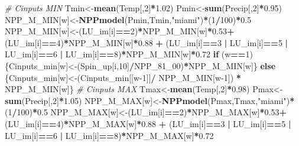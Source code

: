 \documentclass[
  10pt,
  b5paper,
]{book}
\newenvironment{Shaded}{\begin{snugshade}}{\end{snugshade}}
\newcommand{\CommentTok}[1]{\textcolor[rgb]{0.56,0.35,0.01}{\textit{#1}}}
\newcommand{\ControlFlowTok}[1]{\textcolor[rgb]{0.13,0.29,0.53}{\textbf{#1}}}
\newcommand{\DecValTok}[1]{\textcolor[rgb]{0.00,0.00,0.81}{#1}}
\newcommand{\FloatTok}[1]{\textcolor[rgb]{0.00,0.00,0.81}{#1}}
\newcommand{\KeywordTok}[1]{\textcolor[rgb]{0.13,0.29,0.53}{\textbf{#1}}}
\newcommand{\NormalTok}[1]{#1}
\newcommand{\OperatorTok}[1]{\textcolor[rgb]{0.81,0.36,0.00}{\textbf{#1}}}
\newcommand{\StringTok}[1]{\textcolor[rgb]{0.31,0.60,0.02}{#1}}
\begin{document}
\begin{Shaded}
\begin{Highlighting}[]
\CommentTok{# Cinputs MIN}
\NormalTok{Tmin<-}\KeywordTok{mean}\NormalTok{(Temp[,}\DecValTok{2}\NormalTok{]}\OperatorTok{*}\FloatTok{1.02}\NormalTok{)}
\NormalTok{Pmin<-}\KeywordTok{sum}\NormalTok{(Precip[,}\DecValTok{2}\NormalTok{]}\OperatorTok{*}\FloatTok{0.95}\NormalTok{)}
\NormalTok{NPP_M_MIN[w]<-}\KeywordTok{NPPmodel}\NormalTok{(Pmin,Tmin,}\StringTok{"miami"}\NormalTok{)}\OperatorTok{*}\NormalTok{(}\DecValTok{1}\OperatorTok{/}\DecValTok{100}\NormalTok{)}\OperatorTok{*}\FloatTok{0.5}
\NormalTok{NPP_M_MIN[w]<-(LU_im[i]}\OperatorTok{==}\DecValTok{2}\NormalTok{)}\OperatorTok{*}\NormalTok{NPP_M_MIN[w]}\OperatorTok{*}\FloatTok{0.53}\OperatorTok{+}\StringTok{ }\NormalTok{(LU_im[i]}\OperatorTok{==}\DecValTok{4}\NormalTok{)}\OperatorTok{*}\NormalTok{NPP_M_MIN[w]}\OperatorTok{*}\FloatTok{0.88} \OperatorTok{+}\StringTok{ }\NormalTok{(LU_im[i]}\OperatorTok{==}\DecValTok{3} \OperatorTok{|}\StringTok{ }\NormalTok{LU_im[i]}\OperatorTok{==}\DecValTok{5} \OperatorTok{|}\StringTok{ }\NormalTok{LU_im[i]}\OperatorTok{==}\DecValTok{6} \OperatorTok{|}\StringTok{ }\NormalTok{LU_im[i]}\OperatorTok{==}\DecValTok{8}\NormalTok{)}\OperatorTok{*}\NormalTok{NPP_M_MIN[w]}\OperatorTok{*}\FloatTok{0.72}
\ControlFlowTok{if}\NormalTok{ (w}\OperatorTok{==}\DecValTok{1}\NormalTok{) \{Cinputs_min[w]<-(Spin_up[i,}\DecValTok{10}\NormalTok{]}\OperatorTok{/}\NormalTok{NPP_}\DecValTok{81}\NormalTok{_}\DecValTok{00}\NormalTok{)}\OperatorTok{*}\NormalTok{NPP_M_MIN[w]\} }\ControlFlowTok{else}\NormalTok{ \{Cinputs_min[w]<-(Cinputs_min[[w}\DecValTok{-1}\NormalTok{]]}\OperatorTok{/}\StringTok{ }\NormalTok{NPP_M_MIN[w}\DecValTok{-1}\NormalTok{]) }\OperatorTok{*}\StringTok{ }\NormalTok{NPP_M_MIN[w]\} }
\CommentTok{# Cinputs MAX}
\NormalTok{Tmax<-}\KeywordTok{mean}\NormalTok{(Temp[,}\DecValTok{2}\NormalTok{]}\OperatorTok{*}\FloatTok{0.98}\NormalTok{)}
\NormalTok{Pmax<-}\KeywordTok{sum}\NormalTok{(Precip[,}\DecValTok{2}\NormalTok{]}\OperatorTok{*}\FloatTok{1.05}\NormalTok{)}
\NormalTok{NPP_M_MAX[w]<-}\KeywordTok{NPPmodel}\NormalTok{(Pmax,Tmax,}\StringTok{"miami"}\NormalTok{)}\OperatorTok{*}\NormalTok{(}\DecValTok{1}\OperatorTok{/}\DecValTok{100}\NormalTok{)}\OperatorTok{*}\FloatTok{0.5}
\NormalTok{NPP_M_MAX[w]<-(LU_im[i]}\OperatorTok{==}\DecValTok{2}\NormalTok{)}\OperatorTok{*}\NormalTok{NPP_M_MAX[w]}\OperatorTok{*}\FloatTok{0.53}\OperatorTok{+}\StringTok{ }\NormalTok{(LU_im[i]}\OperatorTok{==}\DecValTok{4}\NormalTok{)}\OperatorTok{*}\NormalTok{NPP_M_MAX[w]}\OperatorTok{*}\FloatTok{0.88} \OperatorTok{+}\StringTok{ }\NormalTok{(LU_im[i]}\OperatorTok{==}\DecValTok{3} \OperatorTok{|}\StringTok{ }\NormalTok{LU_im[i]}\OperatorTok{==}\DecValTok{5} \OperatorTok{|}\StringTok{ }\NormalTok{LU_im[i]}\OperatorTok{==}\DecValTok{6} \OperatorTok{|}\StringTok{ }\NormalTok{LU_im[i]}\OperatorTok{==}\DecValTok{8}\NormalTok{)}\OperatorTok{*}\NormalTok{NPP_M_MAX[w]}\OperatorTok{*}\FloatTok{0.72}

\end{Highlighting}
\end{Shaded}
\end{document}
